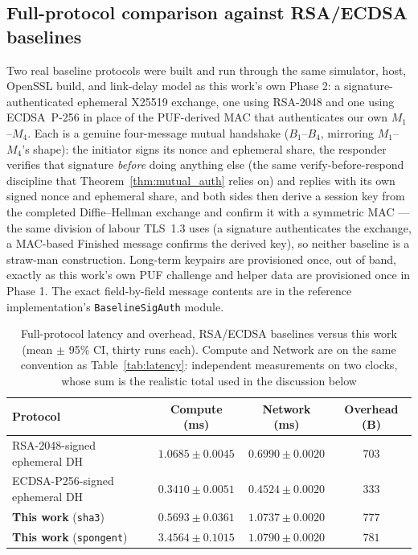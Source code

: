 \documentclass[11pt,a4paper]{article}
\begin{document}
\subsection{Full-protocol comparison against RSA/ECDSA baselines}
\label{subsec:baseline_comparison}

Two real baseline protocols were built and run through the same simulator,
host, OpenSSL build, and link-delay model as this work's own Phase 2: a
signature-authenticated ephemeral X25519 exchange, one using RSA-2048 and one
using ECDSA~P-256 in place of the PUF-derived MAC that
authenticates our own $M_1$--$M_4$. Each is a genuine four-message mutual
handshake ($B_1$--$B_4$, mirroring $M_1$--$M_4$'s shape): the initiator signs
its nonce and ephemeral share, the responder verifies that signature
\emph{before} doing anything else (the same verify-before-respond discipline
that Theorem~\ref{thm:mutual_auth} relies on) and replies with its own signed
nonce and ephemeral share, and both sides then derive a session key
from the completed Diffie--Hellman exchange and confirm it with a symmetric
MAC --- the same division of labour TLS~1.3 uses (a signature authenticates
the exchange, a MAC-based Finished message confirms the derived key), so
neither baseline is a straw-man construction. Long-term keypairs are
provisioned once, out of band, exactly as this work's own PUF challenge and
helper data are provisioned once in Phase 1. The exact field-by-field message
contents are in the reference implementation's \texttt{BaselineSigAuth}
module.

\begin{table}[H]
\centering
\caption{Full-protocol latency and overhead, RSA/ECDSA baselines versus this
work (mean $\pm$ 95\% CI, thirty runs each). Compute and Network are on the same
convention as Table~\ref{tab:latency}: independent measurements on two clocks,
whose sum is the realistic total used in the discussion below}
\label{tab:baseline_comparison}
\small
\begin{tabular}{@{}p{3.6cm}ccc@{}}
\toprule
\textbf{Protocol} & \textbf{Compute (ms)} &
\textbf{Network (ms)} & \textbf{Overhead (B)} \\
\midrule
RSA-2048-signed ephemeral DH & $1.0685 \pm 0.0045$ & $0.6990 \pm 0.0020$ & $703$ \\
ECDSA-P256-signed ephemeral DH & $0.3410 \pm 0.0051$ & $0.4524 \pm 0.0020$ & $333$ \\
\midrule
\textbf{This work} (\texttt{sha3}) & $0.5693 \pm 0.0361$ & $1.0737 \pm 0.0020$ & $777$ \\
\textbf{This work} (\texttt{spongent}) & $3.4564 \pm 0.1015$ & $1.0790 \pm 0.0020$ & $781$ \\
\bottomrule
\end{tabular}
\end{table}
\end{document}
